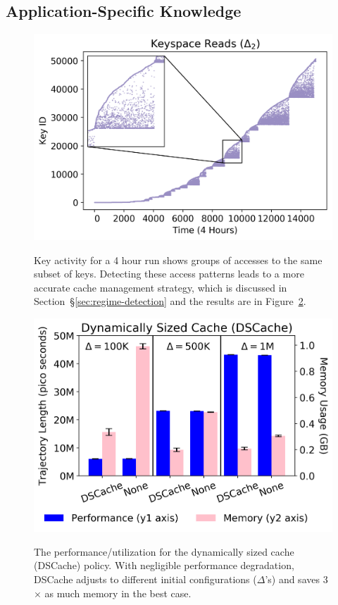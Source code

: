 \subsection{Application-Specific Knowledge}
\label{sec:dom-specific}

\begin{figure}[tb]
  \centering
  \includegraphics[width=1\textwidth]{./chapters/controlplane/parsplice/figures/keyspace-zoomed.png}\\
  \caption{Key activity for a 4 hour run shows groups of accesses to the same
  subset of keys. Detecting these access patterns leads to a more accurate cache
  management strategy, which is discussed in Section~\S\ref{sec:regime-detection}
  and the results are in Figure~\ref{fig:dscache-vs-none}.}
  \label{fig:keyspace-zoomed}
\end{figure}

\begin{figure}[tb]
  \centering
  \includegraphics[width=1\textwidth]{./chapters/controlplane/parsplice/figures/dscache-vs-none.png}\\
  \caption{The performance/utilization for the dynamically sized cache
  (DSCache) policy. With negligible performance degradation, DSCache adjusts to
  different initial configurations (\(\Delta\)'s) and saves 3\(\times\) as much
  memory in the best case.}
  \label{fig:dscache-vs-none}
\end{figure}

